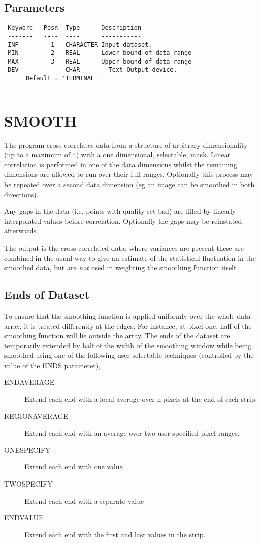 \documentclass{book}
\renewcommand{\_}{{\tt\char'137}}     %
\begin{document}
\subsection{Parameters}
\begin{verbatim}
 Keyword   Posn  Type      Description
 -------   ----  ----      -----------
 INP         1   CHARACTER Input dataset.
 MIN         2   REAL      Lower bound of data range
 MAX         3   REAL      Upper bound of data range
 DEV         -   CHAR        Text Output device.
      Default = 'TERMINAL'
 
\end{verbatim}\section{SMOOTH}
The program cross-correlates data from a structure of arbitrary
dimensionality (up to a maximum of 4) with a one dimensional,
selectable, mask. Linear correlation is performed in one of the
data dimensions whilst the remaining dimensions are allowed to
run over their full ranges. Optionally this process may be
repeated over a second data dimension (eg an image can be
smoothed in both directions).
 
Any gaps in the data (i.e. points with quality set bad) are
filled by linearly interpolated values before correlation.
Optionally the gaps may be reinstated afterwards.
 
The output is the cross-correlated data; where variances are
present these are combined in the usual way to give an estimate
of the statistical fluctuation in the smoothed data, but are
{\em not} used in weighting the smoothing function itself.
 
\subsection{Ends of Dataset}
To ensure that the smoothing function is applied uniformly over
the whole data array, it is treated differently at the edges.
For instance, at pixel one, half of the smoothing function will
lie outside the array. The ends of the dataset are temporarily
extended by half of the width of the smoothing window while
being smoothed using one of the following user selectable
techniques (controlled by the value of the ENDS parameter),
 
\begin{description}
\item[ENDAVERAGE]
Extend each end with a local average over n pixels at
the end of each strip.
\item[REGIONAVERAGE]
Extend each end with an average over two user specified
pixel ranges.
\item[ONESPECIFY]
Extend each end with one value
\item[TWOSPECIFY]
Extend each end with a separate value
\item[ENDVALUE]
Extend each end with the first and last values in the
strip.
\end{description}
\end{document}
